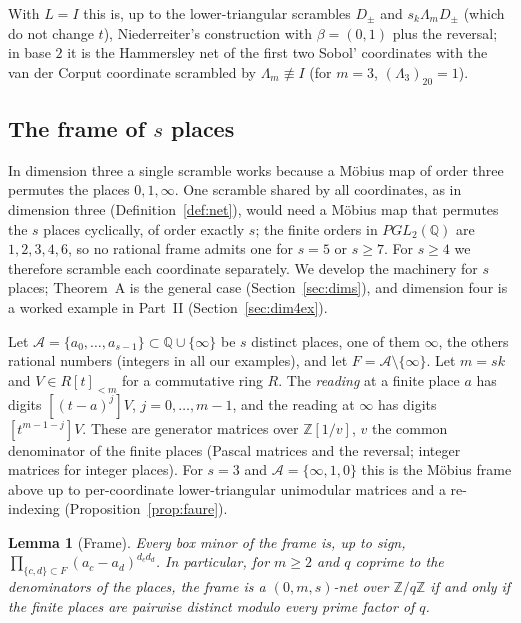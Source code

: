 \documentclass[11pt]{amsart}
\newtheorem{lemma}[theorem]{Lemma}
\theoremstyle{definition}
\theoremstyle{plain}
\newcommand{\Z}{\mathbb{Z}}
\begin{document}
With $L=I$ this is, up to the lower-triangular scrambles $D_{\pm}$ and $s_k\Lambda_m D_{\pm}$ (which do not change $t$), Niederreiter's construction \cite[Thm.~6.2]{Nie87} with $\beta=(0,1)$ plus the reversal; in base $2$ it is the Hammersley net of the first two Sobol' coordinates \cite{Sob67} with the van der Corput coordinate scrambled by $\Lambda_m\not\equiv I$ (for $m=3$, $(\Lambda_3)_{20}=1$).

\subsection{The frame of \texorpdfstring{$s$}{s} places}\label{sec:dim4}
In dimension three a single scramble works because a M\"obius map of order three permutes the places $0,1,\infty$. One scramble shared by all coordinates, as in dimension three (Definition~\ref{def:net}), would need a M\"obius map that permutes the $s$ places cyclically, of order exactly $s$; the finite orders in $PGL_2(\mathbb Q)$ are $1,2,3,4,6$, so no rational frame admits one for $s=5$ or $s\ge7$. For $s\ge4$ we therefore scramble each coordinate separately. We develop the machinery for $s$ places; Theorem~A is the general case (Section~\ref{sec:dims}), and dimension four is a worked example in Part~II (Section~\ref{sec:dim4ex}).

Let $\mathcal A=\{a_0,\dots,a_{s-1}\}\subset\mathbb{Q}\cup\{\infty\}$ be $s$ distinct places, one of them $\infty$, the others rational numbers (integers in all our examples), and let $F=\mathcal A\setminus\{\infty\}$. Let $m=sk$ and $V\in R[t]_{<m}$ for a commutative ring $R$. The \emph{reading} at a finite place $a$ has digits $[(t-a)^j]V$, $j=0,\dots,m-1$, and the reading at $\infty$ has digits $[t^{m-1-j}]V$. These are generator matrices over $\Z[1/v]$, $v$ the common denominator of the finite places (Pascal matrices and the reversal; integer matrices for integer places). For $s=3$ and $\mathcal A=\{\infty,1,0\}$ this is the M\"obius frame above up to per-coordinate lower-triangular unimodular matrices and a re-indexing (Proposition~\ref{prop:faure}).

\begin{lemma}[Frame]\label{lem:Ts}
Every box minor of the frame is, up to sign, $\prod_{\{c,d\}\subset F}(a_c-a_d)^{d_cd_d}$. In particular, for $m\ge2$ and $q$ coprime to the denominators of the places, the frame is a $(0,m,s)$-net over $\Z/q\Z$ if and only if the finite places are pairwise distinct modulo every prime factor of $q$.
\end{lemma}
\end{document}
